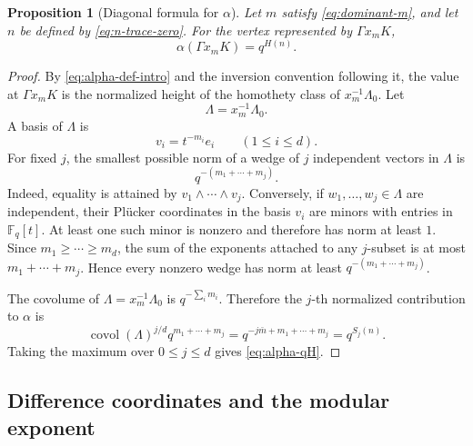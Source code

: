 \documentclass[11pt]{amsart}
\newcommand{\Fq}{\mathbb F_q}
\newcommand{\covol}{\operatorname{covol}}
\theoremstyle{plain}
\newtheorem{proposition}[theorem]{Proposition}
\theoremstyle{definition}
\numberwithin{equation}{section}
\begin{document}
\begin{proposition}[Diagonal formula for $\alpha$]\label{prop:alpha-qH}
Let $m$ satisfy \eqref{eq:dominant-m}, and let $n$ be defined by \eqref{eq:n-trace-zero}.
For the vertex represented by $\Gamma x_mK$,
\begin{equation}\label{eq:alpha-qH}
  \alpha(\Gamma x_mK)=q^{H(n)}.
\end{equation}
\end{proposition}

\begin{proof}
By \eqref{eq:alpha-def-intro} and the inversion convention following it, the value
at \(\Gamma x_mK\) is the normalized height of the homothety class of
\(x_m^{-1}\Lambda_0\).  Let
\[
  \Lambda=x_m^{-1}\Lambda_0.
\]
A basis of \(\Lambda\) is
\[
  v_i=t^{-m_i}e_i\qquad (1\le i\le d).
\]
For fixed \(j\), the smallest possible norm of a wedge of \(j\) independent vectors in
\(\Lambda\) is
\[
  q^{-(m_1+\cdots+m_j)}.
\]
Indeed, equality is attained by \(v_1\wedge\cdots\wedge v_j\).  Conversely, if
\(w_1,\ldots,w_j\in\Lambda\) are independent, their Pl\"ucker coordinates in the basis
\(v_i\) are minors with entries in \(\Fq[t]\).  At least one such minor is nonzero and
therefore has norm at least \(1\).  Since \(m_1\ge\cdots\ge m_d\), the sum of the
exponents attached to any \(j\)-subset is at most \(m_1+\cdots+m_j\).  Hence every
nonzero wedge has norm at least \(q^{-(m_1+\cdots+m_j)}\).

The covolume of \(\Lambda=x_m^{-1}\Lambda_0\) is \(q^{-\sum_i m_i}\).  Therefore the
\(j\)-th normalized contribution to \(\alpha\) is
\[
  \covol(\Lambda)^{j/d} q^{m_1+\cdots+m_j}
  =q^{-j\bar m+m_1+\cdots+m_j}
  =q^{S_j(n)}.
\]
Taking the maximum over \(0\le j\le d\) gives \eqref{eq:alpha-qH}.
\end{proof}

\subsection{Difference coordinates and the modular exponent}
\end{document}
